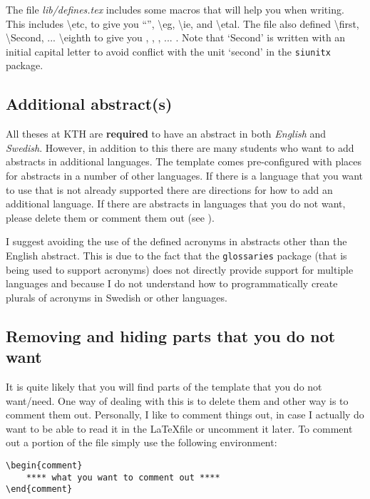 \documentclass[examplethesis.tex]{subfiles}
\begin{document}
The file \textit{lib/defines.tex} includes some macros that will help you when writing. This includes \textbackslash etc, to give you ``\etc'', \textbackslash eg, \textbackslash ie, and \textbackslash etal.
The file also defined \textbackslash first, \textbackslash Second, ... \textbackslash eighth to give you \first, \Second, \third, ... \eighth. Note that `Second' is written with an initial capital letter to avoid conflict with the unit `second' in the \texttt{siunitx} package.

\subsection{Additional abstract(s)}
\label{sec:additionalAbstracts}

All theses at KTH are \textbf{required} to have an abstract in both \textit{English} and \textit{Swedish}. However, in addition to this there are many students who want to add abstracts in additional languages. The template comes pre-configured with places for abstracts in a number of other languages. If there is a language that you want to use that is not already supported there are directions for how to add an additional language. If there are abstracts in languages that you do not want, please delete them or comment them out (see ).

I suggest avoiding the use of the defined acronyms in abstracts other than the English abstract. This is due to the fact that the \texttt{glossaries} package (that is being used to support acronyms) does not directly provide support for multiple languages and because I do not understand how to programmatically create plurals of acronyms in Swedish or other languages.

\subsection{Removing and hiding parts that you do not want}
\label{sec:hideComment}

It is quite likely that you will find parts of the template that you do not want/need. One way of dealing with this is to delete them and other way is to comment them out. Personally, I like to comment things out, in case I actually do want to be able to read it in the \LaTeX\null file or uncomment it later. To comment out a portion of the file simply use the following environment:

\begin{lstlisting}[style=latexExampleForAuthors]
\begin{comment}
    **** what you want to comment out ****
\end{comment}
\end{lstlisting}
\end{document}
